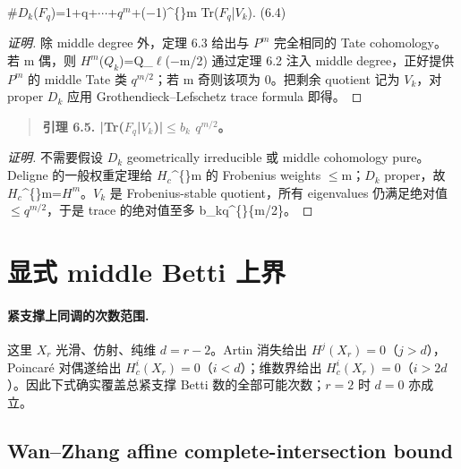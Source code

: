 \documentclass[11pt]{ctexart}
\begin{document}
\#\ensuremath{D_{k}}(\ensuremath{F_{q}})=1+q+\ensuremath{\cdots}+\ensuremath{q^{m}}+(−1)\textasciicircum\{\}m Tr(\ensuremath{F_{q}}|\ensuremath{V_{k}}).    (6.4)

\begin{proof}[证明] 

除 middle degree 外，定理 6.3 给出与 \ensuremath{P^{m}} 完全相同的 Tate cohomology。若 m 偶，则 \ensuremath{H^{m}}(\ensuremath{Q_{k}})=Q\_\ensuremath{\ell}(−m/2) 通过定理 6.2 注入 middle degree，正好提供 \ensuremath{P^{m}} 的 middle Tate 类 \ensuremath{q^{m/2}}；若 m 奇则该项为 0。把剩余 quotient 记为 \ensuremath{V_{k}}，对 proper \ensuremath{D_{k}} 应用 Grothendieck–Lefschetz trace formula 即得。

\end{proof}

\begin{quote}\textbf{引理 6.5. |Tr(\ensuremath{F_{q}}|\ensuremath{V_{k}})|\ensuremath{\le}\ensuremath{b_{k}} \ensuremath{q^{m/2}}。}\end{quote}

\begin{proof}[证明] 

不需要假设 \ensuremath{D_{k}} geometrically irreducible 或 middle cohomology pure。Deligne 的一般权重定理给 \ensuremath{H_{c}}\textasciicircum\{\}m 的 Frobenius weights \ensuremath{\le}m；\ensuremath{D_{k}} proper，故 \ensuremath{H_{c}}\textasciicircum\{\}m=\ensuremath{H^{m}}。\ensuremath{V_{k}} 是 Frobenius-stable quotient，所有 eigenvalues 仍满足绝对值 \ensuremath{\le}\ensuremath{q^{m/2}}，于是 trace 的绝对值至多 b\_kq\textasciicircum\{\}\{m/2\}。

\end{proof}

\section{显式 middle Betti 上界}

\paragraph{紧支撑上同调的次数范围.} 这里 $X_r$ 光滑、仿射、纯维 $d=r-2$。Artin 消失给出 $H^j(X_r)=0$（$j>d$），Poincar\'e 对偶遂给出 $H_c^i(X_r)=0$（$i<d$）；维数界给出 $H_c^i(X_r)=0$（$i>2d$）。因此下式确实覆盖总紧支撑 Betti 数的全部可能次数；$r=2$ 时 $d=0$ 亦成立。

\subsection{Wan–Zhang affine complete-intersection bound}
\end{document}
